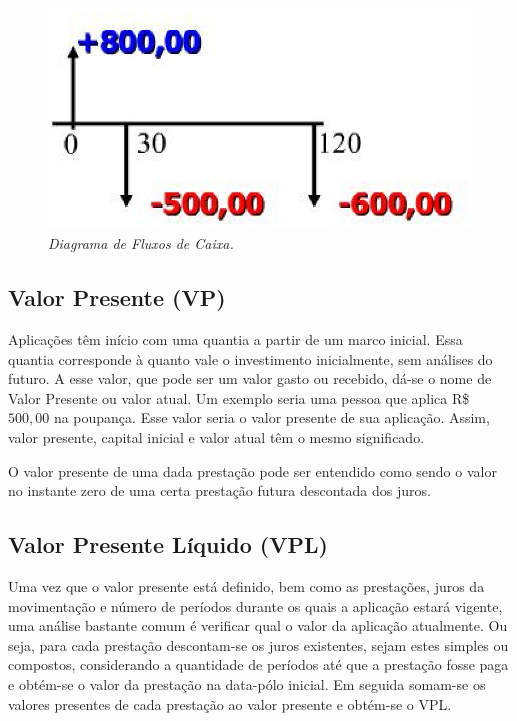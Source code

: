 \begin{figure}[!h]
 \centering
 \includegraphics[scale=0.8]{fluxo.eps}
 \caption{\it Diagrama de Fluxos de Caixa.} \label{fluxo}
\end{figure}

\subsection{Valor Presente (VP)}

Aplicações têm início com uma quantia a partir de um marco inicial. Essa quantia corres\-ponde à quanto vale o investimento inicialmente, sem análises do futuro. A esse valor, que pode ser um valor gasto ou recebido, dá-se o nome de Valor Presente ou valor atual. Um exemplo seria uma pessoa que aplica R\$ $500,00$ na poupança. Esse valor seria o valor presente de sua aplicação. Assim, valor presente, capital inicial e valor atual têm o mesmo significado.

O valor presente de uma dada prestação pode ser entendido como sendo o valor no ins\-tante zero de uma certa prestação futura descontada dos juros.

\subsection{Valor Presente Líquido (VPL)}

Uma vez que o valor presente está definido, bem como as prestações, juros da movimentação e número de períodos durante os quais a aplicação estará vigente, uma análise bastante comum é verificar qual o valor da aplicação atualmente. Ou seja, para cada prestação descontam-se os juros existentes, sejam estes simples ou compostos, considerando a quantidade de períodos até que a prestação fosse paga e obtém-se o valor da prestação na data-pólo inicial. Em seguida somam-se os valores presentes de cada prestação ao valor presente e obtém-se o VPL.

